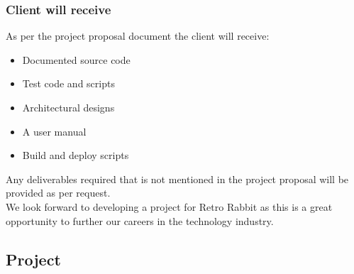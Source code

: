 \documentclass{article}
\begin{document}
	\subsubsection{Client will receive}
	As per the project proposal document the client will receive:
	\begin{itemize}
		\item Documented source code
		\item Test code and scripts
		\item Architectural designs
		\item A user manual
		\item Build and deploy scripts
	\end{itemize}
	Any deliverables required that is not mentioned in the project proposal will be provided as per request.\\
	
	We look forward to developing a project for Retro Rabbit as this is a great opportunity to further our  careers in the technology industry.
	
	\subsection{Project }
\end{document}
